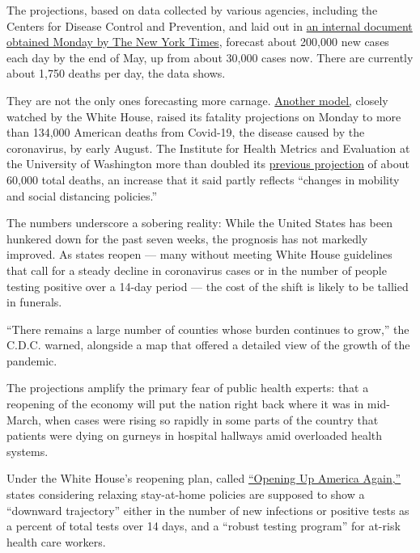 The projections, based on data collected by various agencies, including
the Centers for Disease Control and Prevention, and laid out in
\href{https://int.graylady3jvrrxbe.onion/data/documenthelper/6926-mayhhsbriefing/af7319f4a55fd0ce5dc9/optimized/full.pdf\#page=1}{an
internal document obtained Monday by The New York Times}, forecast about
200,000 new cases each day by the end of May, up from about 30,000 cases
now. There are currently about 1,750 deaths per day, the data shows.

They are not the only ones forecasting more carnage.
\href{https://covid19.healthdata.org/united-states-of-america}{Another
model,} closely watched by the White House, raised its fatality
projections on Monday to more than 134,000 American deaths from
Covid-19, the disease caused by the coronavirus, by early August. The
Institute for Health Metrics and Evaluation at the University of
Washington more than doubled its
\href{http://www.healthdata.org/news-release/ihme-hold-media-briefing-4-pm-eastern-today-details-below}{previous
projection} of about 60,000 total deaths, an increase that it said
partly reflects ``changes in mobility and social distancing policies.''

The numbers underscore a sobering reality: While the United States has
been hunkered down for the past seven weeks, the prognosis has not
markedly improved. As states reopen --- many without meeting White House
guidelines that call for a steady decline in coronavirus cases or in the
number of people testing positive over a 14-day period --- the cost of
the shift is likely to be tallied in funerals.

``There remains a large number of counties whose burden continues to
grow,'' the C.D.C. warned, alongside a map that offered a detailed view
of the growth of the pandemic.

The projections amplify the primary fear of public health experts: that
a reopening of the economy will put the nation right back where it was
in mid-March, when cases were rising so rapidly in some parts of the
country that patients were dying on gurneys in hospital hallways amid
overloaded health systems.

Under the White House's reopening plan, called
\href{https://www.whitehouse.gov/openingamerica/}{``Opening Up America
Again,''} states considering relaxing stay-at-home policies are supposed
to show a ``downward trajectory'' either in the number of new infections
or positive tests as a percent of total tests over 14 days, and a
``robust testing program'' for at-risk health care workers.

